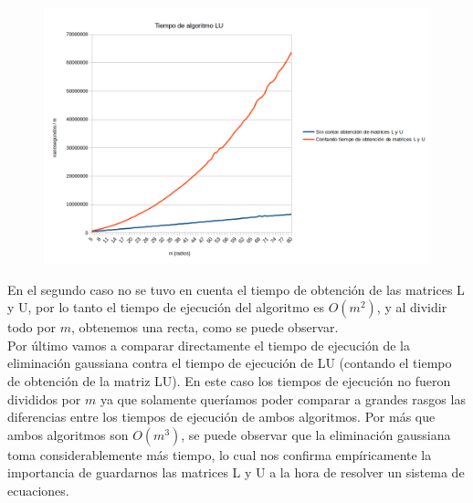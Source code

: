 \begin{figure}[h]
  \center
  \includegraphics[scale=0.6]{imagenes/tiempoLUdivididoM.png}
  \label{fig:ludivididom}
\end{figure}


En el segundo caso no se tuvo en cuenta el tiempo de obtención de las matrices L y U, por lo tanto el tiempo de ejecución del algoritmo es $O(m^{2})$, y al dividir todo por $m$, obtenemos una recta, como se puede observar. \\


Por último vamos a comparar directamente el tiempo de ejecución de la eliminación gaussiana contra el tiempo de ejecución de LU (contando el tiempo de obtención de la matriz LU). En este caso los tiempos de ejecución no fueron divididos por $m$ ya que solamente queríamos poder comparar a grandes rasgos las diferencias entre los tiempos de ejecución de ambos algoritmos. Por más que ambos algoritmos son $O(m^{3})$, se puede observar que la eliminación gaussiana toma considerablemente más tiempo, lo cual nos confirma empíricamente la importancia de guardarnos las matrices L y U a la hora de resolver un sistema de ecuaciones.

\newpage

